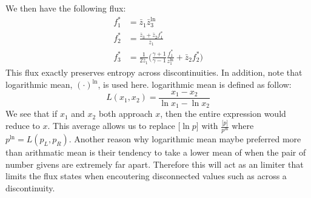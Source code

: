 \documentclass[a4paper]{article}
\numberwithin{equation}{section}
\begin{document}
We then have the following flux:
\begin{equation}
    \begin{split}
        f_1^* &= \bar{z}_1 \bar{z}_3^{\ln}\\
        f_2^* &= \frac{\bar{z}_3 + \bar{z}_2 f_1^*}{\bar{z}_1}\\
        f_3^* &= \frac{1}{2\bar{z}_1}\big(\frac{\gamma + 1}{\gamma -1} \frac{f_1^*}{z_1^{\ln}} + \bar{z}_2 f_2^* \big)
    \end{split}
\end{equation}
This flux exactly preserves entropy across discontinuities. In addition, note that logarithmic mean, $(\cdot)^{\ln}$, is used here. 
logarithmic mean is defined as follow:
\begin{equation}
    L(x_1,x_2) = \frac{x_1 - x_2}{\ln x_1 - \ln x_2}
\end{equation}
We see that if $x_1$ and $x_2$ both approach $x$, then the entire expression would reduce to $x$. This average allows us to replace $\big[\ln p\big]$ with $\frac{\big[p\big]}{p^{\ln}}$ where $p^{\ln} = L(p_L,p_R)$.
Another reason why logarithmic mean maybe preferred more than arithmatic mean is their tendency to take a lower mean of when the pair of number givens are extremely far apart. Therefore this will act as an limiter that limits the flux states when encoutering disconnected values such as across a discontinuity. 
\end{document}
